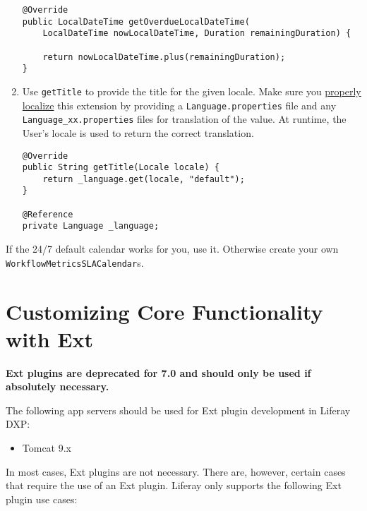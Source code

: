 \begin{enumerate}
\begin{verbatim}
@Override
public LocalDateTime getOverdueLocalDateTime(
    LocalDateTime nowLocalDateTime, Duration remainingDuration) {

    return nowLocalDateTime.plus(remainingDuration);
}
\end{verbatim}
\item
  Use \texttt{getTitle} to provide the title for the given locale. Make
  sure you
  \href{/docs/7-2/frameworks/-/knowledge_base/f/localizing-your-application}{properly
  localize} this extension by providing a \texttt{Language.properties}
  file and any \texttt{Language\_xx.properties} files for translation of
  the value. At runtime, the User's locale is used to return the correct
  translation.

\begin{verbatim}
@Override
public String getTitle(Locale locale) {
    return _language.get(locale, "default");
}

@Reference
private Language _language;
\end{verbatim}
\end{enumerate}

If the 24/7 default calendar works for you, use it. Otherwise create
your own \texttt{WorkflowMetricsSLACalendar}s.

\chapter{Customizing Core Functionality with
Ext}\label{customizing-core-functionality-with-ext}

\noindent\hrulefill

\textbf{Ext plugins are deprecated for 7.0 and should only be used if
absolutely necessary.}

The following app servers should be used for Ext plugin development in
Liferay DXP:

\begin{itemize}
\tightlist
\item
  Tomcat 9.x
\end{itemize}

In most cases, Ext plugins are not necessary. There are, however,
certain cases that require the use of an Ext plugin. Liferay only
supports the following Ext plugin use cases:

